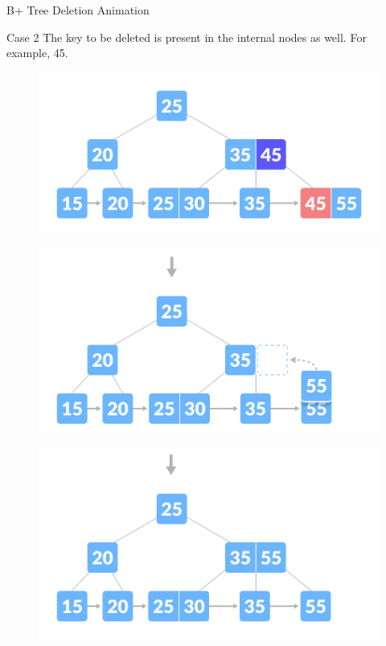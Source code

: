 \documentclass{beamer}
\begin{document}
\begin{frame}{B+ Tree Deletion Animation}
\begin{table}[h]
\begin{overprint}
\begin{figure}
        \end{figure}
        \begin{block}{Case 2}
              The key to be deleted is present in the internal nodes as well. For example, 45.
        \end{block}
        \begin{figure}
            \centering
              \includegraphics[scale=0.4]{Images/deletion-3.1.png}
        \end{figure}
        \begin{figure}
             \centering
             \includegraphics[scale=0.4]{Images/deletion-3.2.png}
        \end{figure}
        \begin{figure}
             \centering
             \includegraphics[scale=0.4]{Images/deletion-3.3.png}

\end{figure}
\end{overprint}
\end{table}
\end{frame}
\end{document}
